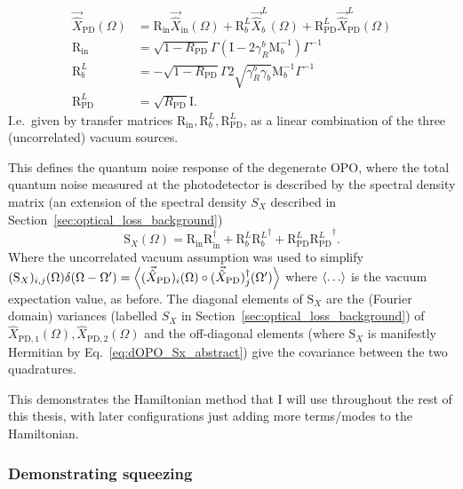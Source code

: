 \begin{align}
\label{eq:dOPO_PD_as_fn_of_vac}
\vec{\hat X}_\mathrm{PD}(\Omega)&=\text{R}_\text{in}\vec{\hat X}_\mathrm{in}(\Omega)+\text{R}^L_b\vec{\hat X}^L_b(\Omega)+\text{R}^L_\text{PD}\vec{\hat X}^L_\text{PD}(\Omega)\\
\text{R}_\text{in}&=\sqrt{1-R_\text{PD}}\Gamma\left(\text{I}-2\gamma^b_R\text{M}_b^{-1}\right)\Gamma^{-1}\\
\text{R}^L_b&=-\sqrt{1-R_\text{PD}}\Gamma 2\sqrt{\gamma^b_R \gamma_b}\text{M}_b^{-1}\Gamma^{-1}\\
\text{R}^L_\text{PD}&=\sqrt{R_\text{PD}} \text{I}.
\end{align}
I.e.\ given by transfer matrices $\text{R}_\text{in},\text{R}^L_b, \text{R}^L_\text{PD}$, as a linear combination of the three (uncorrelated) vacuum sources.

This defines the quantum noise response of the degenerate OPO, where the total quantum noise measured at the photodetector is described by the spectral density matrix (an extension of the spectral density $S_X$ described in Section~\ref{sec:optical_loss_background}) \begin{equation}\label{eq:dOPO_Sx_abstract}\text{S}_X(\Omega)=\text{R}_\text{in} \text{R}_\text{in}^\dag+\text{R}^L_b {\text{R}^L_b}^\dag+\text{R}^L_\text{PD}{\text{R}^L_\text{PD}}^\dag.\end{equation} Where the uncorrelated vacuum assumption was used to simplify $(\text{S}_X)_{i,j}(\Omega)\delta(\Omega-\Omega')=\ev{(\vec{\hat X}_\text{PD})_i(\Omega)\circ(\vec{\hat X}_\text{PD})_j^\dag(\Omega')}$ where $\ev{\ldots}$ is the vacuum expectation value, as before. The diagonal elements of $\text{S}_X$ are the (Fourier domain) variances (labelled $S_X$ in Section~\ref{sec:optical_loss_background}) of ${\hat X}_{\mathrm{PD},1}(\Omega), {\hat X}_{\mathrm{PD},2}(\Omega)$ and the off-diagonal elements (where $\text{S}_X$ is manifestly Hermitian by Eq.~\ref{eq:dOPO_Sx_abstract}) give the covariance between the two quadratures.

This demonstrates the Hamiltonian method that I will use throughout the rest of this thesis, with later configurations just adding more terms/modes to the Hamiltonian. %

\subsubsection{Demonstrating squeezing}

